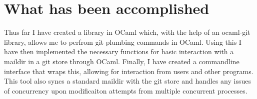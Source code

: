 \documentclass[12pt,a4paper,twoside]{article}
\begin{document}
\section*{What has been accomplished}

Thus far I have created a library in OCaml which, with the help of an ocaml-git library, allows me to perfrom git plumbing commands in OCaml. Using this I have then implemented the necessary functions for basic interaction with a maildir in a git store through OCaml. Finally, I have created a commandline interface that wraps this, allowing for interaction from users and other programs. This tool also syncs a standard maildir with the git store and handles any issues of concurrency upon modificaiton attempts from multiple concurrent processes.
\end{document}
